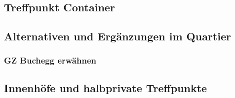 \documentclass[a4paper,ngerman,11pt]{scrartcl}
\begin{document}
\subsection{Treffpunkt Container}
\label{sec-6-5}

\subsection{Alternativen und Ergänzungen im Quartier}
\label{sec-6-6}

\subsubsection{GZ Buchegg erwähnen}
\label{sec-6-6-1}

\subsection{Innenhöfe und halbprivate Treffpunkte}
\label{sec-6-7}
\end{document}
